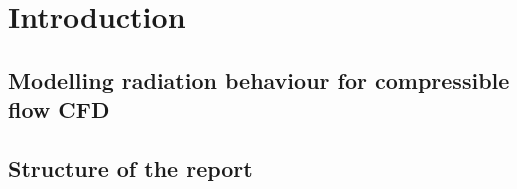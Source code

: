 \chapter{Introduction}

\section{Modelling radiation behaviour for compressible flow CFD}

\section{Structure of the report}













